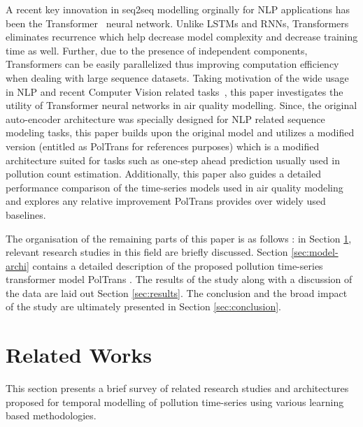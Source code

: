 \documentclass[10pt,journal]{IEEEtran}
\begin{document}
A recent key innovation in seq2seq modelling orginally for NLP applications has been the Transformer~\cite{Vaswani.2017} neural network. Unlike LSTMs and RNNs, Transformers eliminates recurrence which help decrease model complexity and decrease training time as well. Further, due to the presence of independent components, Transformers can be easily parallelized thus improving computation efficiency when dealing with large sequence datasets.  Taking motivation of the wide usage in NLP and recent Computer Vision related tasks~\cite{Parmer.2018}, this paper investigates the utility of Transformer neural networks in air quality modelling. Since, the original  auto-encoder architecture was specially designed for NLP related sequence modeling tasks, this paper builds upon the original model and utilizes a modified version (entitled as {PolTrans} for references purposes) which is a modified architecture suited for tasks such as one-step ahead prediction usually used in pollution count estimation. Additionally, this paper also guides a detailed performance comparison of the time-series models used in air quality modeling and explores any relative improvement {PolTrans}  provides over widely used baselines.

The organisation of the remaining parts of this paper is as follows : in Section \ref{sec:related-works}, relevant research studies in this field are briefly discussed. Section \ref{sec:model-archi} contains a detailed description of the proposed pollution time-series transformer model {PolTrans} . The results of the study along with a discussion of the data are laid out Section \ref{sec:results}. The conclusion and the broad impact of the study are ultimately presented in Section \ref{sec:conclusion}.

\section{Related Works}
\label{sec:related-works}

This section presents a brief survey of related research studies and architectures proposed for temporal modelling of pollution time-series using various learning based methodologies.
\end{document}

